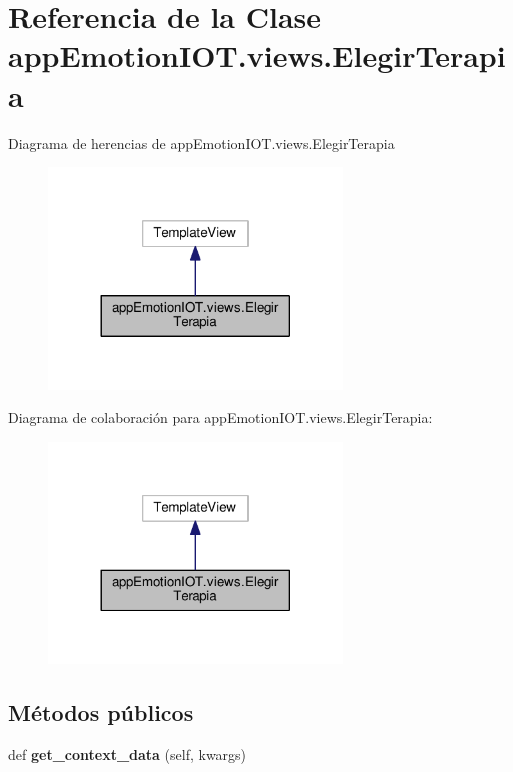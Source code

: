 \hypertarget{classappEmotionIOT_1_1views_1_1ElegirTerapia}{}\section{Referencia de la Clase app\+Emotion\+I\+O\+T.\+views.\+Elegir\+Terapia}
\label{classappEmotionIOT_1_1views_1_1ElegirTerapia}


Diagrama de herencias de app\+Emotion\+I\+O\+T.\+views.\+Elegir\+Terapia
\nopagebreak
\begin{figure}[H]
\begin{center}
\leavevmode
\includegraphics[width=221pt]{classappEmotionIOT_1_1views_1_1ElegirTerapia__inherit__graph}
\end{center}
\end{figure}


Diagrama de colaboración para app\+Emotion\+I\+O\+T.\+views.\+Elegir\+Terapia\+:
\nopagebreak
\begin{figure}[H]
\begin{center}
\leavevmode
\includegraphics[width=221pt]{classappEmotionIOT_1_1views_1_1ElegirTerapia__coll__graph}
\end{center}
\end{figure}
\subsection*{Métodos públicos}
\begin{DoxyCompactItemize}
\item 
def {\bfseries get\+\_\+context\+\_\+data} (self, kwargs)\hypertarget{classappEmotionIOT_1_1views_1_1ElegirTerapia_abe8e6e0e1915ea7b6c2b0e8fb790479d}{}\label{classappEmotionIOT_1_1views_1_1ElegirTerapia_abe8e6e0e1915ea7b6c2b0e8fb790479d}

\end{DoxyCompactItemize}
